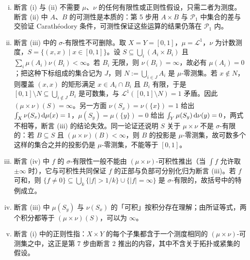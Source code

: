 \documentclass[../../main.tex]{subfiles}%
\begin{document}
\begin{remark}\label{remark:ch01-thm-1-22-条件}
\begin{enumerate}[(i)]
\item 断言 (i) 与 (ii) 不需要 $\mu$、$\nu$ 的任何有限性或正则性假设，只需二者为测度。断言 (ii) 中 $A$、$B$ 的可测性是本质的：第 5 步用 $A\times B$ 与 $\mathcal{P}_1$ 中集合的差与交验证 Carathéodory 条件，可测性保证这些运算的结果仍落在 $\mathcal{P}_1$ 内。
\item 断言 (iii) 中的 $\sigma$-有限性不可删除。取 $X=Y=[0,1]$，$\mu=\mathcal{L}^1$，$\nu$ 为计数测度，$S=\{(x,x)\mid x\in[0,1]\}$。设 $S\subseteq\bigcup_i(A_i\times B_i)$ 且 $\sum_i\mu(A_i)\nu(B_i)<\infty$。若 $B_i$ 无限，则 $\nu(B_i)=\infty$，故必有 $\mu(A_i)=0$；把这种下标组成的集合记为 $J$，则 $N:=\bigcup_{i\in J}A_i$ 是 $\mu$-零测集。若 $x\notin N$，则覆盖 $(x,x)$ 的矩形满足 $x\in A_i\cap B_i$ 且 $B_i$ 有限，于是 $[0,1]\setminus N\subseteq\bigcup_{i\notin J}B_i$ 是可数集，与 $\mathcal{L}^1([0,1]\setminus N)=1$ 矛盾。因此 $(\mu\times\nu)(S)=\infty$。另一方面 $\nu(S_x)=\nu(\{x\})=1$ 给出 $\int_X\nu(S_x)\,\mathrm{d}\mu(x)=1$，$\mu(S_y)=\mu(\{y\})=0$ 给出 $\int_Y\mu(S_y)\,\mathrm{d}\nu(y)=0$，两式不相等，断言 (iii) 的结论失效。同一论证还说明 $S$ 关于 $\mu\times\nu$ 不是 $\sigma$-有限的：若 $B\subseteq S$ 且 $(\mu\times\nu)(B)<\infty$，则 $B$ 的投影是 $\mu$-零测集，故可数多个这样的集合之并的投影仍是 $\mu$-零测集，不能等于 $[0,1]$。
\item 断言 (iv) 中 $f$ 的 $\sigma$-有限性一般不能由 $(\mu\times\nu)$-可积性推出（当 $\int f$ 允许取 $\pm\infty$ 时），它与可积性共同保证 $f$ 的正部与负部可分别化归为断言 (iii)。若 $f$ 可和，则 $\{f\neq0\}\subseteq\bigcup_k\{\lvert f\rvert>1/k\}\cup\{\lvert f\rvert=\infty\}$ 是 $\sigma$-有限的，故括号中的特例成立。
\item 断言 (iii) 中 $\mu(S_y)$ 与 $\nu(S_x)$ 的「可积」按积分存在理解；由所证等式，两个积分都等于 $(\mu\times\nu)(S)$，可以为 $\infty$。
\item 断言 (i) 中的正则性指：$X\times Y$ 的每个子集都含于一个测度相同的 $(\mu\times\nu)$-可测集之中，这正是第 7 步由断言 2 推出的内容，其中不含关于拓扑或紧集的假设。
\end{enumerate}
\end{remark}
\end{document}
